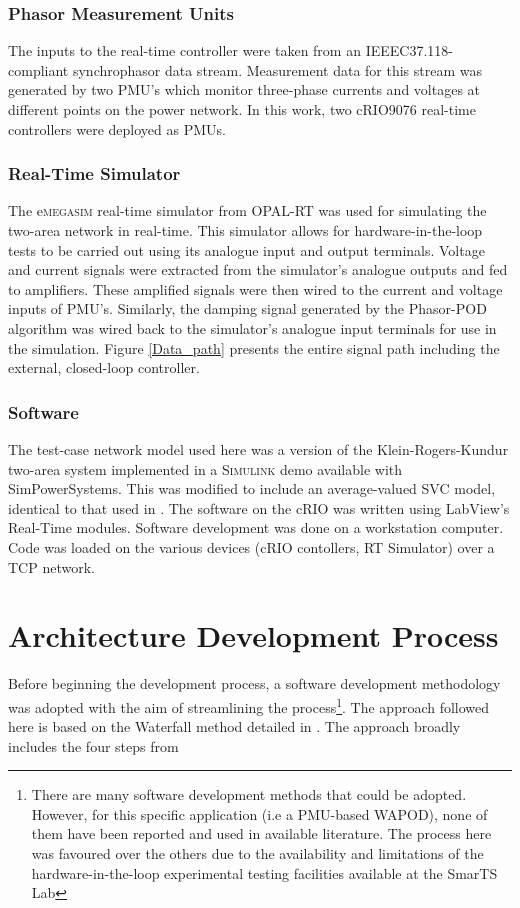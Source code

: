 \documentclass[conference]{IEEEtran}
\begin{document}
\subsubsection*{Phasor Measurement Units}
The inputs to the real-time controller were taken from an IEEEC37.118-compliant synchrophasor data stream. Measurement data for this stream was generated by two PMU's which monitor three-phase currents and voltages at different points on the power network. In this work, two cRIO9076 real-time controllers \cite{cRIO9081} were deployed as PMUs\cite{PMUMario}.

\subsubsection*{Real-Time Simulator}
The e\textsc{megasim} real-time simulator from OPAL-RT \cite{OPALemegasim} was used for simulating the two-area network in real-time. This simulator allows for hardware-in-the-loop tests to be carried out using its analogue input and output terminals. Voltage and current signals were extracted from the simulator's analogue outputs and fed to amplifiers. These amplified signals were then wired to the current and voltage inputs of PMU's. Similarly, the damping signal generated by the Phasor-POD algorithm was wired back to the simulator's analogue input terminals for use in the simulation. Figure \ref{Data_path} presents the entire signal path including the external, closed-loop controller.

\subsubsection*{Software}
The test-case network model used here was a version of the Klein-Rogers-Kundur two-area system implemented in a \textsc{Simulink} demo available with SimPowerSystems\cite{SIMULINKOnline}. This was modified to include an average-valued SVC model, identical to that used in \cite{PhasorPODImplement}. The software on the cRIO was written using LabView's Real-Time modules. Software development was done on a workstation computer. Code was loaded on the various devices (cRIO contollers, RT Simulator) over a TCP network.


\section{Architecture Development Process}\label{arch}

Before beginning the development process, a software development methodology was adopted with the aim of streamlining the process\footnote{There are many software development methods that could be adopted. However, for this specific application (i.e a PMU-based WAPOD), none of them have been reported and used in available literature. The process here was favoured over the others due to the availability and limitations of the hardware-in-the-loop experimental testing facilities available at the SmarTS Lab\cite{SmarTSLab}}. The approach followed here is based on the Waterfall method detailed in \cite{WaterfallCoding}. The approach broadly includes the four steps from \cite{WaterfallCoding} 
\end{document}
